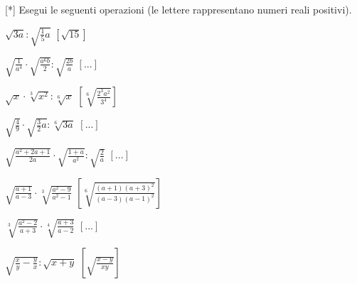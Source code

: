 \begin{esercizio}
\label{ese:2.35}[*]
Esegui le seguenti operazioni (le lettere rappresentano numeri reali 
positivi).
\begin{htmulticols}{2}
\begin{enumeratea}
\item \(\sqrt{3a}:\sqrt{\frac 1 5a}\)
\hfill \(\left[\sqrt{15}\right]\)
\item \(\sqrt{\frac 1{a^4}}\cdot \sqrt{\frac{a^6b} 2}:\sqrt{\frac{2b} a}\)
\hfill \(\left[...\right]\)
\item \(\sqrt x\cdot \sqrt[3]{x^2}:\sqrt[6]x\)
\hfill \(\left[\sqrt[6]{\frac{2^3a^2}{3^4}}\right]\)
\item \(\sqrt{\frac 4 9}\cdot \sqrt{\frac 3 2a}:\sqrt[6]{3a}\)
\hfill \(\left[...\right]\)
\item \(\sqrt{\frac{a^2+2a+1}{2a}}\cdot \sqrt{\frac{1+a}{a^2}}:
      \sqrt{\frac 2 a}\)
\hfill \(\left[...\right]\)
\item \(\sqrt{\frac{a+1}{a-3}}\cdot \sqrt[3]{\frac{a^2-9}{a^2-1}}\)
\hfill \(\left[\sqrt[6]{\frac{(a+1)(a+3)^2}{(a-3)(a-1)^2}}\right]\)
\item \(\sqrt[3]{\frac{a^2-2}{a+3}}\cdot \sqrt[4]{\frac{a+3}{a-2}}\)
\hfill \(\left[...\right]\)
\item \(\sqrt{\frac x y-\frac y x}:\sqrt{x+y}\)
\hfill \(\left[\sqrt{\frac{x-y}{xy}}\right]\)
\end{enumeratea}
\end{htmulticols}
\end{esercizio}

